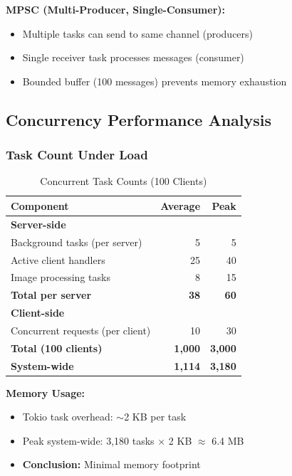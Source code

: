 \documentclass[12pt,a4paper]{article}
\begin{document}
\textbf{MPSC (Multi-Producer, Single-Consumer):}
\begin{itemize}
    \item Multiple tasks can send to same channel (producers)
    \item Single receiver task processes messages (consumer)
    \item Bounded buffer (100 messages) prevents memory exhaustion
\end{itemize}

\subsection{Concurrency Performance Analysis}

\subsubsection{Task Count Under Load}

\begin{table}[h]
\centering
\caption{Concurrent Task Counts (100 Clients)}
\label{tab:task-counts}
\begin{tabular}{@{}lrr@{}}
\toprule
\textbf{Component} & \textbf{Average} & \textbf{Peak} \\
\midrule
\textbf{Server-side} & & \\
\quad Background tasks (per server) & 5 & 5 \\
\quad Active client handlers & 25 & 40 \\
\quad Image processing tasks & 8 & 15 \\
\quad \textbf{Total per server} & \textbf{38} & \textbf{60} \\
\midrule
\textbf{Client-side} & & \\
\quad Concurrent requests (per client) & 10 & 30 \\
\quad \textbf{Total (100 clients)} & \textbf{1,000} & \textbf{3,000} \\
\midrule
\textbf{System-wide} & \textbf{1,114} & \textbf{3,180} \\
\bottomrule
\end{tabular}
\end{table}

\textbf{Memory Usage:}
\begin{itemize}
    \item Tokio task overhead: $\sim$2 KB per task
    \item Peak system-wide: 3,180 tasks $\times$ 2 KB $\approx$ 6.4 MB
    \item \textbf{Conclusion:} Minimal memory footprint
\end{itemize}
\end{document}
